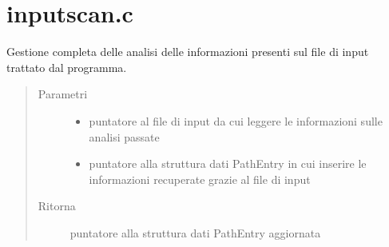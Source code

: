 \documentclass[letterpaper,10pt,italian,openany,oneside]{sphinxmanual}
\begin{document}
\section{inputscan.c}
\label{\detokenize{code/inputscan:inputscan-c}}\label{\detokenize{code/inputscan::doc}}

\begin{fulllineitems}
\label{\detokenize{code/inputscan:c.readInputFile}}
Gestione completa delle analisi delle informazioni presenti sul file di input trattato dal programma.
\begin{quote}\begin{description}
\item[{Parametri}] \leavevmode\begin{itemize}
\item {} 
 \textendash{} puntatore al file di input da cui leggere le informazioni sulle analisi passate

\item {} 
 \textendash{} puntatore alla struttura dati PathEntry in cui inserire le informazioni recuperate grazie al file di input

\end{itemize}

\item[{Ritorna}] \leavevmode
puntatore alla struttura dati PathEntry aggiornata

\end{description}\end{quote}

\end{fulllineitems}

\end{document}
